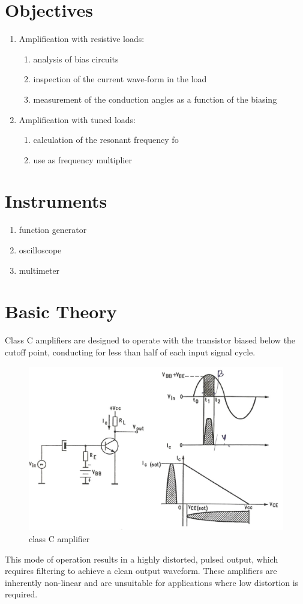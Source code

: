 \documentclass[12pt,a4paper]{report}
\begin{document}
\section{Objectives}
\begin{enumerate}
    \item Amplification with resistive loads:
    \begin{enumerate}
        \item analysis of bias circuits
        \item inspection of the current wave-form in the load
        \item measurement of the conduction angles as a function of the biasing
    \end{enumerate}
    \item Amplification with tuned loads:
    \begin{enumerate}
        \item calculation of the resonant frequency fo
        \item use as frequency multiplier
    \end{enumerate}
\end{enumerate}
\section{Instruments}
\begin{enumerate}
    \item function generator
    \item oscilloscope
    \item multimeter
\end{enumerate}
\section{Basic Theory}
Class C amplifiers are designed to operate with the transistor biased below the cutoff point, conducting for less than half of each input signal cycle.
\begin{figure}[H]
    \centering
    \includegraphics[width=0.5\linewidth]{analogue1_1.jpeg}
    \caption{class C amplifier}
    \label{fig:B32.1}
\end{figure}
This mode of operation results in a highly distorted, pulsed output, which requires filtering to achieve a clean output waveform. These amplifiers are inherently non-linear and are unsuitable for applications where low distortion is required.
\end{document}
